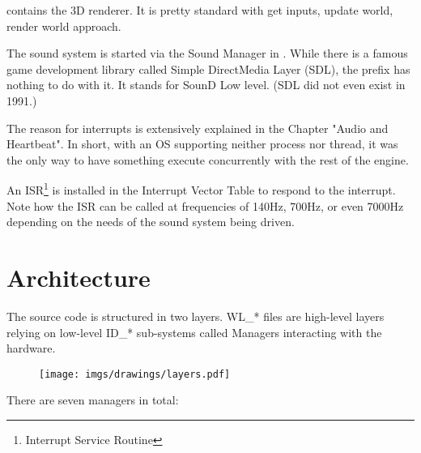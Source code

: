 \documentclass[book.tex]{subfiles}
\begin{document}
 contains the 3D renderer. It is pretty standard with get inputs, update world, render world approach.\\
\par
\begin{minipage}{\textwidth}

\end{minipage}
\par
The sound system is started via the Sound Manager in . While there is a famous game development library called Simple DirectMedia Layer (SDL), the prefix  has nothing to do with it. It stands for SounD Low level. (SDL did not even exist in 1991.)\\
\par
The reason for interrupts is extensively explained in the Chapter "Audio and Heartbeat". In short, with an OS supporting neither process nor thread, it was the only way to have something execute concurrently with the rest of the engine.\\
\par
An ISR\footnote{Interrupt Service Routine} is installed in the Interrupt Vector Table to respond to the interrupt. Note how the ISR can be called at frequencies of 140Hz, 700Hz, or even 7000Hz depending on the needs of the sound system being driven.\\
\par
\begin{minipage}{\textwidth}

\end{minipage}
\par
















\section{Architecture}

The source code is structured in two layers. WL\_* files are high-level layers relying on low-level ID\_* sub-systems called Managers interacting with the hardware.\\
\par
\begin{figure}[H]
\centering
\texttt{[image: imgs/drawings/layers.pdf]} 
 \end{figure}
 \par
There are seven managers in total:\\
\end{document}
